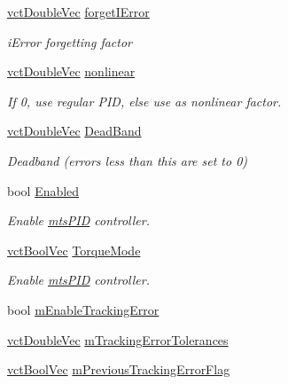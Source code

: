 \begin{DoxyCompactItemize}
\hyperlink{vct_dynamic_vector_types_8h_ade4b3068c86fb88f41af2e5187e491c2}{vct\-Double\-Vec} \hyperlink{classmts_p_i_d_a030332a1f4dead8460baeb6693c76195}{forget\-I\-Error}
\begin{DoxyCompactList}\small\item\em i\-Error forgetting factor \end{DoxyCompactList}\item 
\hyperlink{vct_dynamic_vector_types_8h_ade4b3068c86fb88f41af2e5187e491c2}{vct\-Double\-Vec} \hyperlink{classmts_p_i_d_a999fa0d68f5e49a7d26a9cf60ee738c7}{nonlinear}
\begin{DoxyCompactList}\small\item\em If 0, use regular P\-I\-D, else use as nonlinear factor. \end{DoxyCompactList}\item 
\hyperlink{vct_dynamic_vector_types_8h_ade4b3068c86fb88f41af2e5187e491c2}{vct\-Double\-Vec} \hyperlink{classmts_p_i_d_a1af99beeae2d49d92974919056a62c48}{Dead\-Band}
\begin{DoxyCompactList}\small\item\em Deadband (errors less than this are set to 0) \end{DoxyCompactList}\item 
bool \hyperlink{classmts_p_i_d_afc7cfa0ce58391af303c8efc4430e427}{Enabled}
\begin{DoxyCompactList}\small\item\em Enable \hyperlink{classmts_p_i_d}{mts\-P\-I\-D} controller. \end{DoxyCompactList}\item 
\hyperlink{vct_dynamic_vector_types_8h_aeb2237c134aee3769198bd9d55c8a9e0}{vct\-Bool\-Vec} \hyperlink{classmts_p_i_d_a7bd7ccfcdc69d5d5b91087f019c01c63}{Torque\-Mode}
\begin{DoxyCompactList}\small\item\em Enable \hyperlink{classmts_p_i_d}{mts\-P\-I\-D} controller. \end{DoxyCompactList}\item 
bool \hyperlink{classmts_p_i_d_aa6fc2821554893e5dfe885094fde8017}{m\-Enable\-Tracking\-Error}
\item 
\hyperlink{vct_dynamic_vector_types_8h_ade4b3068c86fb88f41af2e5187e491c2}{vct\-Double\-Vec} \hyperlink{classmts_p_i_d_aad179eaa7eaf2157c2afb60a3d2c4f5d}{m\-Tracking\-Error\-Tolerances}
\item 
\hyperlink{vct_dynamic_vector_types_8h_aeb2237c134aee3769198bd9d55c8a9e0}{vct\-Bool\-Vec} \hyperlink{classmts_p_i_d_ad152e451f55030b547b0d1afe9dcf3d9}{m\-Previous\-Tracking\-Error\-Flag}

\end{DoxyCompactItemize}

